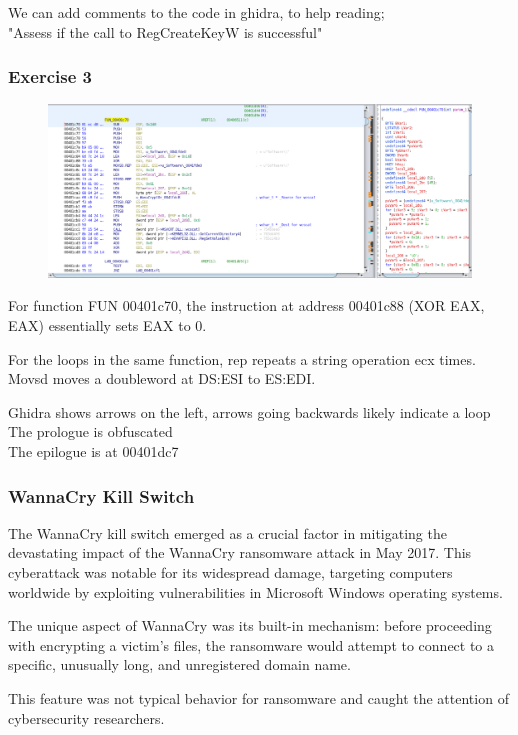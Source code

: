 \documentclass[]{project_plan}
\begin{document}
We can add comments to the code in ghidra, to help reading;\\
"Assess if the call to RegCreateKeyW is successful"

\subsubsection{Exercise 3}

\begin{figure}[H]
  \centering
  \includegraphics[width=\linewidth]{lab2 ghidra FUN 00401c70.png}
\end{figure}

For function FUN 00401c70, the instruction at address
00401c88 (XOR EAX, EAX) essentially sets EAX to 0.

For the loops in the same function, rep repeats a string operation ecx times.
Movsd moves a doubleword at DS:ESI to ES:EDI.

Ghidra shows arrows on the left, arrows going backwards likely indicate a loop\\
The prologue is obfuscated\\
The epilogue is at 00401dc7

\subsubsection{WannaCry Kill Switch}
The WannaCry kill switch emerged as a crucial factor in mitigating the
devastating impact of the WannaCry ransomware attack in May 2017. This cyberattack
was notable for its widespread damage, targeting computers worldwide by
exploiting vulnerabilities in Microsoft Windows operating systems.

The unique
aspect of WannaCry was its built-in mechanism: before proceeding with
encrypting a victim’s files, the ransomware would attempt to connect to
a specific, unusually long, and unregistered domain name.

This feature was not typical behavior for ransomware and caught the attention
of cybersecurity researchers.
\end{document}
